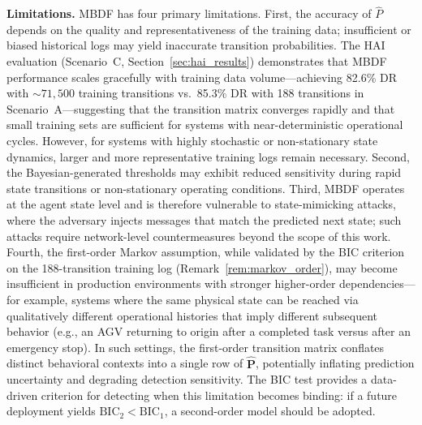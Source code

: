 \documentclass[manuscript,screen,review]{acmart}
\begin{document}
\textbf{Limitations.}
MBDF has four primary limitations.
First, the accuracy of $\hat{P}$ depends on
the quality and representativeness of the training data;
insufficient or biased historical logs may yield
inaccurate transition probabilities. The HAI evaluation
(Scenario~C, Section~\ref{sec:hai_results}) demonstrates
that MBDF performance scales gracefully with training
data volume---achieving 82.6\% DR with ${\sim}71{,}500$
training transitions vs.\ 85.3\% DR with 188 transitions
in Scenario~A---suggesting that the transition matrix
converges rapidly and that small training sets are
sufficient for systems with near-deterministic operational
cycles. However, for systems with highly stochastic or
non-stationary state dynamics, larger and more
representative training logs remain necessary.
Second, the Bayesian-generated thresholds may exhibit
reduced sensitivity during rapid state transitions or
non-stationary operating conditions.
Third, MBDF operates at the agent state level and is
therefore vulnerable to state-mimicking attacks, where
the adversary injects messages that match the predicted
next state; such attacks require network-level
countermeasures beyond the scope of this work.
Fourth, the first-order Markov assumption, while
validated by the BIC criterion on the 188-transition
training log (Remark~\ref{rem:markov_order}), may
become insufficient in production environments with
stronger higher-order dependencies---for example,
systems where the same physical state can be reached
via qualitatively different operational histories that
imply different subsequent behavior (e.g., an AGV
returning to origin after a completed task versus
after an emergency stop). In such settings, the
first-order transition matrix conflates distinct
behavioral contexts into a single row of $\hat{\mathbf{P}}$,
potentially inflating prediction uncertainty and
degrading detection sensitivity. The BIC test provides
a data-driven criterion for detecting when this
limitation becomes binding: if a future deployment
yields $\mathrm{BIC}_2 < \mathrm{BIC}_1$, a
second-order model should be adopted.
\end{document}
